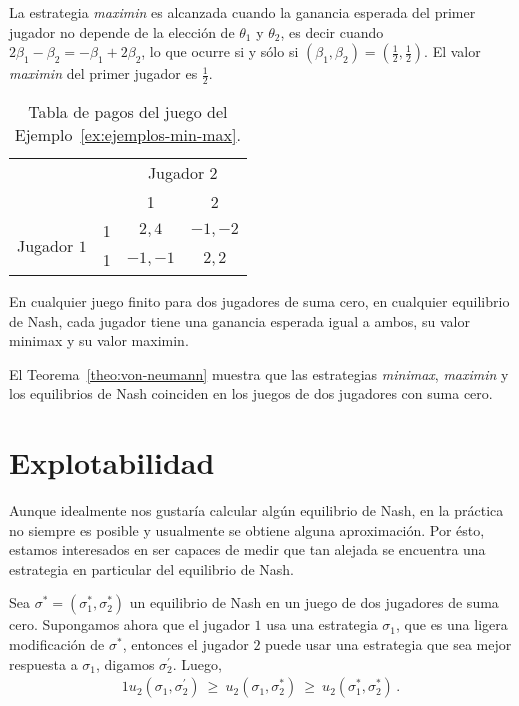 La estrategia \textit{maximin} es alcanzada cuando la ganancia esperada del primer jugador no depende de la elección de $\theta_1$ y $\theta_2$, es decir cuando $2\beta_1 - \beta_2 = -\beta_1 + 2\beta_2$, lo que ocurre si y sólo si $(\beta_1, \beta_2) = \left(\frac{1}{2}, \frac{1}{2}\right)$. El valor \textit{maximin} del primer jugador es $\frac{1}{2}$.

\begin{table}[h]
\begin{center}
\caption{Tabla de pagos del juego del Ejemplo~\ref{ex:ejemplos-min-max}.}
\label{table:ejemplos-min-max}
\begin{tabular}{ c r | c | c |}
 & \multicolumn{1}{c}{} & \multicolumn{2}{c}{Jugador $2$} \\
 & \multicolumn{1}{c}{} & \multicolumn{1}{c}{1} & \multicolumn{1}{c}{2}  \\ \cline{3-4}
 \multirow{2}{*}{Jugador $1$}
 & 1 & $2, 4$ & $-1, -2$ \\ \cline{3-4}
 & 1 & $-1, -1$ & $2, 2$ \\ \cline{3-4}
\end{tabular}
\end{center}
\end{table}

\begin{theorem}
\label{theo:von-neumann}
En cualquier juego finito para dos jugadores de suma cero, en cualquier equilibrio de Nash, cada jugador tiene una ganancia esperada igual a ambos, su valor minimax y su valor maximin.  
\end{theorem}

El Teorema~\ref{theo:von-neumann} muestra que las estrategias \textit{minimax}, \textit{maximin} y los equilibrios de Nash coinciden en los juegos de dos jugadores con suma cero.

\section{Explotabilidad}
\label{section:explotabilidad}

Aunque idealmente nos gustaría calcular algún equilibrio de Nash, en la práctica no siempre es posible y usualmente se obtiene alguna aproximación. Por ésto, estamos interesados en ser capaces de medir que tan alejada se encuentra una estrategia en particular del equilibrio de Nash.

Sea $\sigma^* = (\sigma^*_1, \sigma^*_2)$ un equilibrio de Nash en un juego de dos jugadores de suma cero. Supongamos ahora que el jugador $1$  usa una estrategia $\sigma_1$, que es una ligera modificación de $\sigma^*$, entonces el jugador $2$ puede usar una estrategia que sea mejor respuesta a $\sigma_1$, digamos $\sigma^{\prime}_2$. Luego,
\begin{alignat}{1}
u_2(\sigma_1, \sigma^{\prime}_2)\ \geq\ u_2(\sigma_1, \sigma^*_2)\ \geq\ u_2(\sigma^*_1, \sigma^*_2) \,.
\end{alignat}

